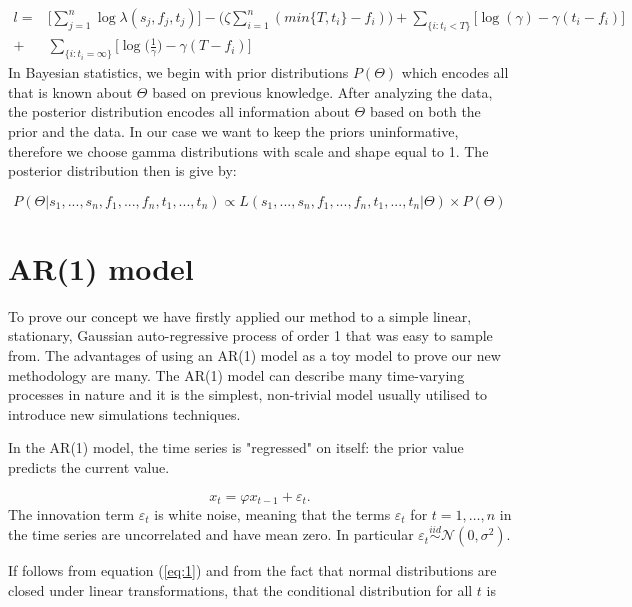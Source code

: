 \documentclass[11pt,a4paper]{article}
\newcommand{\eps}{\varepsilon}
\begin{document}
\[
\begin{aligned}
l = & \Bigg[ \sum_{j=1}^{n} \log \lambda(s_{j},f_{j}, t_{j}) \Bigg] - \bigg(\zeta \sum_{i=1}^{n} (min\{ T, t_i \} - f_i) \bigg)  + \sum_{\{ i : t_{i} < T \} }  \bigg[\log (\gamma) -\gamma(t_{i} - f_{i}) \bigg] \\
+ & \sum_{ \{ i : t_{i} = \infty \} } \bigg[\log \bigg(\frac{1}{\gamma}\bigg) -\gamma(T - f_{i}) \bigg]
\end{aligned}
\]
In Bayesian statistics, we begin with prior distributions $P(\Theta)$ which encodes all that is known about $\Theta$ based on previous knowledge. After analyzing the data, the posterior distribution encodes all information about $\Theta$ based on both the prior and the data. In our case we want to keep the priors uninformative, therefore we choose gamma distributions with scale and shape equal to 1. The posterior distribution then is give by:

\[
P(\Theta | s_{1}, ..., s_{n}, f_{1}, ... , f_{n}, t_{1}, ..., t_{n}) \propto L(s_{1}, ..., s_{n}, f_{1}, ... , f_{n}, t_{1}, ..., t_{n} | \Theta) \times P(\Theta)
\]






\section{AR(1) model}

To prove our concept we have firstly applied our method to a simple linear, stationary, Gaussian auto-regressive process of order 1 that was easy to sample from. The advantages of using an AR(1) model as a toy model to prove our new methodology are many. The AR(1) model can describe many time-varying processes in nature and it is the simplest, non-trivial model usually utilised to introduce new simulations techniques.

In the AR(1) model, the time series is "regressed" on itself: the prior value predicts the current value.

\begin{equation} \label{eq:1}
x_{t} = \varphi x_{t-1} + \eps_{t}.
\end{equation}
The innovation term $\eps_t$ is white noise, meaning that the terms $\eps_t$ for $t = 1 , \dots, n$ in the time series are uncorrelated and have mean zero. In particular $\eps_{t} \stackrel{iid}{\sim} \mathcal{N}(0, \sigma^{2})$.

If follows from equation (\ref{eq:1}) and from the fact that normal distributions are closed under linear transformations, that the conditional distribution for all $t$ is
\end{document}
